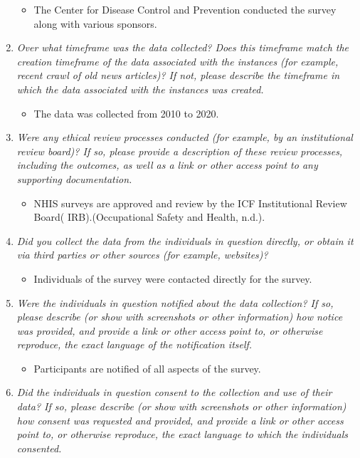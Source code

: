 \documentclass[
]{article}
\providecommand{\tightlist}{%
  \setlength{\itemsep}{0pt}\setlength{\parskip}{0pt}}
\begin{document}
\begin{enumerate}
  \begin{itemize}
  \tightlist
  \item
    The Center for Disease Control and Prevention conducted the survey
    along with various sponsors.
  \end{itemize}
\item
  \emph{Over what timeframe was the data collected? Does this timeframe
  match the creation timeframe of the data associated with the instances
  (for example, recent crawl of old news articles)? If not, please
  describe the timeframe in which the data associated with the instances
  was created.}

  \begin{itemize}
  \tightlist
  \item
    The data was collected from 2010 to 2020.
  \end{itemize}
\item
  \emph{Were any ethical review processes conducted (for example, by an
  institutional review board)? If so, please provide a description of
  these review processes, including the outcomes, as well as a link or
  other access point to any supporting documentation.}

  \begin{itemize}
  \tightlist
  \item
    NHIS surveys are approved and review by the ICF Institutional Review
    Board( IRB).(Occupational Safety and Health, n.d.).
  \end{itemize}
\item
  \emph{Did you collect the data from the individuals in question
  directly, or obtain it via third parties or other sources (for
  example, websites)?}

  \begin{itemize}
  \tightlist
  \item
    Individuals of the survey were contacted directly for the survey.
  \end{itemize}
\item
  \emph{Were the individuals in question notified about the data
  collection? If so, please describe (or show with screenshots or other
  information) how notice was provided, and provide a link or other
  access point to, or otherwise reproduce, the exact language of the
  notification itself.}

  \begin{itemize}
  \tightlist
  \item
    Participants are notified of all aspects of the survey.
  \end{itemize}
\item
  \emph{Did the individuals in question consent to the collection and
  use of their data? If so, please describe (or show with screenshots or
  other information) how consent was requested and provided, and provide
  a link or other access point to, or otherwise reproduce, the exact
  language to which the individuals consented.}


\end{enumerate}
\end{document}
